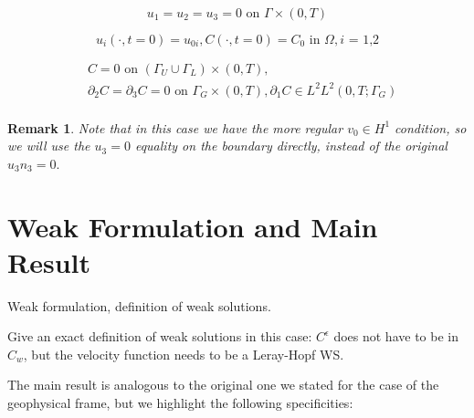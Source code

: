 \documentclass[11pt]{article}
\newtheorem{remark}{Remark}
\begin{document}
    \begin{equation} \label{HNSC6}   
    u_1 = u_2 = u_3 = 0 \text{ on } \Gamma \times (0,T)
    \end{equation}
    
    \begin{equation} \label{HNSC7}   
    u_i (\cdot, t=0) = u_{0 i}, C (\cdot, t=0) = C_0 \text{ in } \Omega, \text{$i$ = 1,2}
    \end{equation}
    
    \begin{equation} \label{HNSC8}
      \begin{split}
        &C = 0 \text{ on } ( \Gamma_U \cup \Gamma_L) \times (0,T), \\
        & \partial_2 C = \partial_3 C = 0 \text{ on } \Gamma_G \times (0,T), \partial_1 C \in L^2 L^2 (0,T; \Gamma_G) \\
      \end{split}
    \end{equation}
    
    \begin{remark}
    Note that in this case we have the more regular $v_0 \in H^1$ condition, so we will use the $u_3 = 0$ equality on the boundary directly, instead of the original $u_3 n_3 = 0.$
    \end{remark}

\section{Weak Formulation and Main Result} \label{weakformulationmainresult}

Weak formulation, definition of weak solutions. 

Give an exact definition of weak solutions in this case: $C^\epsilon$ does not have to be in $C_w$, but the velocity function needs to be a Leray-Hopf WS.

The main result is analogous to the original one we stated for the case of the geophysical frame, but we highlight the following specificities:
\end{document}
